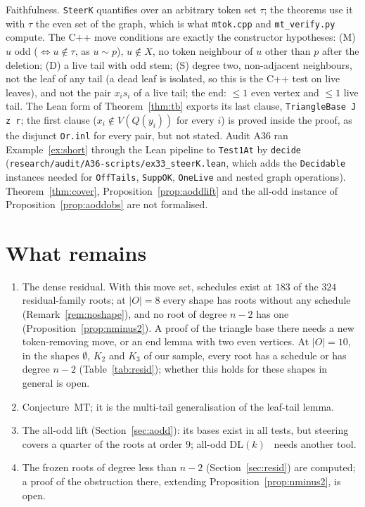 \documentclass[11pt]{amsart}
\theoremstyle{definition}
\newcommand{\MT}{\mathrm{MT}}
\begin{document}
Faithfulness. \texttt{SteerK} quantifies over an arbitrary token set $\tau$; the theorems use it
with $\tau$ the even set of the graph, which is what \texttt{mtok.cpp} and
\texttt{mt\_verify.py} compute. The C++ move conditions are exactly the constructor hypotheses:
(M) $u$ odd ($\Leftrightarrow u\notin\tau$, as $u\sim p$), $u\notin X$, no token neighbour of $u$
other than $p$ after the deletion; (D) a live tail with odd stem; (S) degree two, non-adjacent
neighbours, not the leaf of any tail (a dead leaf is isolated, so this is the C++ test on live
leaves), and not the pair $x_is_i$ of a live tail; the end: $\le1$ even vertex and $\le1$ live
tail. The Lean form of Theorem~\ref{thm:tb} exports its last clause, \texttt{TriangleBase J z r};
the first clause ($x_i\notin V(Q(y_i))$ for every $i$) is proved inside the proof, as the disjunct
\texttt{Or.inl} for every pair, but not stated. Audit A36 ran Example~\ref{ex:short} through the Lean
pipeline to \texttt{Test1At} by \texttt{decide} (\texttt{research/audit/A36-scripts/ex33\_steerK.lean},
which adds the \texttt{Decidable} instances needed for \texttt{OffTails}, \texttt{SuppOK},
\texttt{OneLive} and nested graph operations). Theorem~\ref{thm:cover},
Proposition~\ref{prop:aoddlift} and the all-odd instance of Proposition~\ref{prop:aoddobs} are not
formalised.

\section{What remains}\label{sec:open}

\begin{enumerate}
\item The dense residual. With this move set, schedules exist at $183$ of the $324$ residual-family
roots; at $|O|=8$ every shape has roots without any schedule (Remark~\ref{rem:noshape}), and no root
of degree $n-2$ has one (Proposition~\ref{prop:nminus2}). A proof of the triangle base there needs a
new token-removing move, or an end lemma with two even vertices. At $|O|=10$, in the shapes
$\emptyset$, $K_2$ and $K_3$ of our sample, every root has a schedule or has degree $n-2$
(Table~\ref{tab:resid}); whether this holds for these shapes in general is open.
\item Conjecture~$\MT$; it is the multi-tail generalisation of the leaf-tail lemma.
\item The all-odd lift (Section~\ref{sec:aodd}): its bases exist in all tests, but steering covers a
quarter of the roots at order $9$; all-odd DL$(k)$~\cite[\S31]{SYN} needs another tool.
\item The frozen roots of degree less than $n-2$ (Section~\ref{sec:resid}) are computed; a proof of the
obstruction there, extending Proposition~\ref{prop:nminus2}, is open.
\end{enumerate}
\end{document}
